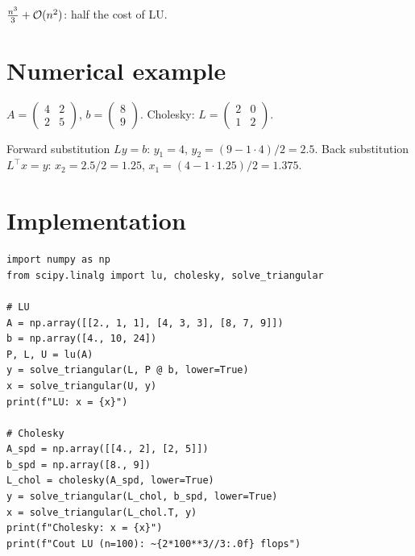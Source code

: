 \begin{algorithm}[H]
\caption{Cholesky factorisation}\label{alg:cholesky}
\end{algorithm}

\begin{theorem}
$\frac{n^3}{3}+\mathcal{O}(n^2)$: half the cost of LU.
\end{theorem}

\section{Numerical example}

$A=\begin{pmatrix}4&2\\2&5\end{pmatrix}$, $b=\begin{pmatrix}8\\9\end{pmatrix}$. Cholesky: $L=\begin{pmatrix}2&0\\1&2\end{pmatrix}$.

Forward substitution $Ly=b$: $y_1=4$, $y_2=(9-1\cdot4)/2=2.5$. Back substitution $L^\top x=y$: $x_2=2.5/2=1.25$, $x_1=(4-1\cdot 1.25)/2=1.375$.

\section{Implementation}

\begin{codeblock}[title=\textbf{Python}]
\begin{verbatim}
import numpy as np
from scipy.linalg import lu, cholesky, solve_triangular

# LU
A = np.array([[2., 1, 1], [4, 3, 3], [8, 7, 9]])
b = np.array([4., 10, 24])
P, L, U = lu(A)
y = solve_triangular(L, P @ b, lower=True)
x = solve_triangular(U, y)
print(f"LU: x = {x}")

# Cholesky
A_spd = np.array([[4., 2], [2, 5]])
b_spd = np.array([8., 9])
L_chol = cholesky(A_spd, lower=True)
y = solve_triangular(L_chol, b_spd, lower=True)
x = solve_triangular(L_chol.T, y)
print(f"Cholesky: x = {x}")
print(f"Cout LU (n=100): ~{2*100**3//3:.0f} flops")
\end{verbatim}
\end{codeblock}

